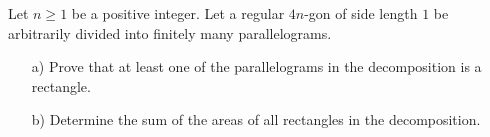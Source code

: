 Let $n \geq 1$ be a positive integer. Let a regular $4n$-gon of side length $1$ be
arbitrarily divided into finitely many parallelograms.
\begin{enumerate}
    \item[a)] Prove that at least one of the parallelograms in the decomposition is a rectangle.
    \item[b)] Determine the sum of the areas of all rectangles in the decomposition.
\end{enumerate}
